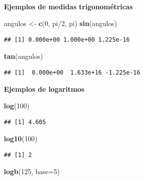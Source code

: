 \documentclass[10pt,]{krantz}
\makeatletter
\newenvironment{Shaded}{\begin{snugshade}}{\end{snugshade}}
\newcommand{\KeywordTok}[1]{\textcolor[rgb]{0.13,0.29,0.53}{\textbf{{#1}}}}
\newcommand{\DataTypeTok}[1]{\textcolor[rgb]{0.13,0.29,0.53}{{#1}}}
\newcommand{\DecValTok}[1]{\textcolor[rgb]{0.00,0.00,0.81}{{#1}}}
\newcommand{\StringTok}[1]{\textcolor[rgb]{0.31,0.60,0.02}{{#1}}}
\newcommand{\NormalTok}[1]{{#1}}
\newenvironment{kframe}{%
\medskip{}
\setlength{\fboxsep}{.8em}
 \def\at@end@of@kframe{}%
 \ifinner\ifhmode%
  \def\at@end@of@kframe{\end{minipage}}%
  \begin{minipage}{\columnwidth}%
 \fi\fi%
 \def\FrameCommand##1{\hskip\@totalleftmargin \hskip-\fboxsep
 \colorbox{shadecolor}{##1}\hskip-\fboxsep
     \hskip-\linewidth \hskip-\@totalleftmargin \hskip\columnwidth}%
 \MakeFramed {\advance\hsize-\width
   \@totalleftmargin\z@ \linewidth\hsize
   \@setminipage}}%
 {\par\unskip\endMakeFramed%
 \at@end@of@kframe}
\renewenvironment{Shaded}{\begin{kframe}}{\end{kframe}}
\makeatother
\begin{document}
\textbf{Ejemplos de medidas trigonométricas}

\begin{Shaded}
\begin{Highlighting}[]
\NormalTok{angulos <-}\StringTok{ }\KeywordTok{c}\NormalTok{(}\DecValTok{0}\NormalTok{, pi/}\DecValTok{2}\NormalTok{, pi)}
\KeywordTok{sin}\NormalTok{(angulos)}
\end{Highlighting}
\end{Shaded}

\begin{verbatim}
## [1] 0.000e+00 1.000e+00 1.225e-16
\end{verbatim}

\begin{Shaded}
\begin{Highlighting}[]
\KeywordTok{tan}\NormalTok{(angulos)}
\end{Highlighting}
\end{Shaded}

\begin{verbatim}
## [1]  0.000e+00  1.633e+16 -1.225e-16
\end{verbatim}

\textbf{Ejemplos de logaritmos}

\begin{Shaded}
\begin{Highlighting}[]
\KeywordTok{log}\NormalTok{(}\DecValTok{100}\NormalTok{)}
\end{Highlighting}
\end{Shaded}

\begin{verbatim}
## [1] 4.605
\end{verbatim}

\begin{Shaded}
\begin{Highlighting}[]
\KeywordTok{log10}\NormalTok{(}\DecValTok{100}\NormalTok{)}
\end{Highlighting}
\end{Shaded}

\begin{verbatim}
## [1] 2
\end{verbatim}

\begin{Shaded}
\begin{Highlighting}[]
\KeywordTok{logb}\NormalTok{(}\DecValTok{125}\NormalTok{, }\DataTypeTok{base=}\DecValTok{5}\NormalTok{)}
\end{Highlighting}
\end{Shaded}
\end{document}
